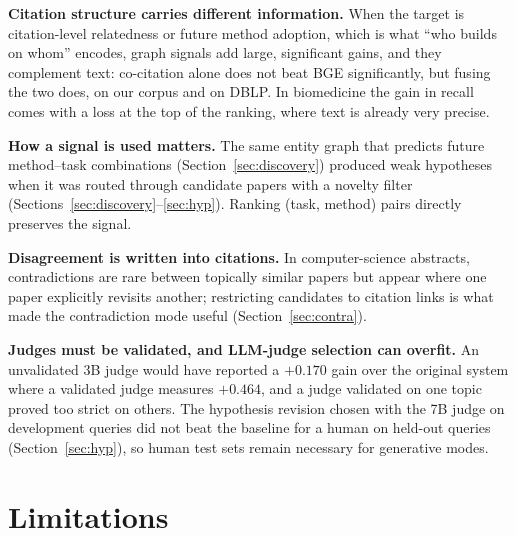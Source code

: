 \documentclass[conference]{IEEEtran}
\begin{document}
\textbf{Citation structure carries different information.} When the target is citation-level relatedness or future method adoption, which is what ``who builds on whom'' encodes, graph signals add large, significant gains, and they complement text: co-citation alone does not beat BGE significantly, but fusing the two does, on our corpus and on DBLP. In biomedicine the gain in recall comes with a loss at the top of the ranking, where text is already very precise.

\textbf{How a signal is used matters.} The same entity graph that predicts future method--task combinations (Section~\ref{sec:discovery}) produced weak hypotheses when it was routed through candidate papers with a novelty filter (Sections~\ref{sec:discovery}--\ref{sec:hyp}). Ranking (task, method) pairs directly preserves the signal.

\textbf{Disagreement is written into citations.} In computer-science abstracts, contradictions are rare between topically similar papers but appear where one paper explicitly revisits another; restricting candidates to citation links is what made the contradiction mode useful (Section~\ref{sec:contra}).

\textbf{Judges must be validated, and LLM-judge selection can overfit.} An unvalidated 3B judge would have reported a $+0.170$ gain over the original system where a validated judge measures $+0.464$, and a judge validated on one topic proved too strict on others. The hypothesis revision chosen with the 7B judge on development queries did not beat the baseline for a human on held-out queries (Section~\ref{sec:hyp}), so human test sets remain necessary for generative modes.

\section{Limitations}
\end{document}

